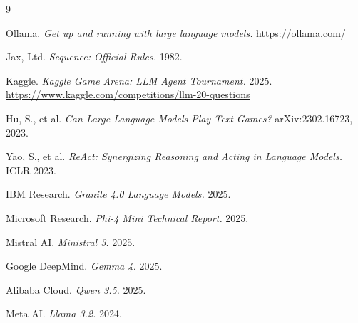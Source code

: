 \documentclass[11pt]{article}
\begin{document}
\begin{thebibliography}{9}

Ollama. \textit{Get up and running with large language models.} \url{https://ollama.com/}

Jax, Ltd. \textit{Sequence: Official Rules.} 1982.

Kaggle. \textit{Kaggle Game Arena: LLM Agent Tournament.} 2025. \url{https://www.kaggle.com/competitions/llm-20-questions}

Hu, S., et al. \textit{Can Large Language Models Play Text Games?} arXiv:2302.16723, 2023.

Yao, S., et al. \textit{ReAct: Synergizing Reasoning and Acting in Language Models.} ICLR 2023.

IBM Research. \textit{Granite 4.0 Language Models.} 2025.

Microsoft Research. \textit{Phi-4 Mini Technical Report.} 2025.

Mistral AI. \textit{Ministral 3.} 2025.

Google DeepMind. \textit{Gemma 4.} 2025.

Alibaba Cloud. \textit{Qwen 3.5.} 2025.

Meta AI. \textit{Llama 3.2.} 2024.

\end{thebibliography}
\end{document}
